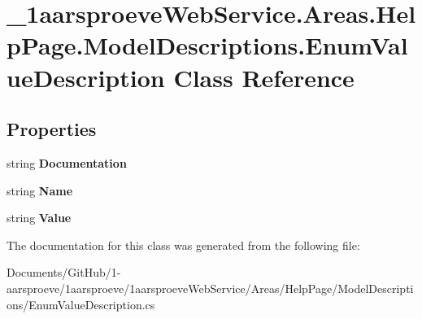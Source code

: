 \hypertarget{class__1aarsproeve_web_service_1_1_areas_1_1_help_page_1_1_model_descriptions_1_1_enum_value_description}{}\section{\+\_\+1aarsproeve\+Web\+Service.\+Areas.\+Help\+Page.\+Model\+Descriptions.\+Enum\+Value\+Description Class Reference}
\label{class__1aarsproeve_web_service_1_1_areas_1_1_help_page_1_1_model_descriptions_1_1_enum_value_description}
\subsection*{Properties}
\begin{DoxyCompactItemize}
\item 
\hypertarget{class__1aarsproeve_web_service_1_1_areas_1_1_help_page_1_1_model_descriptions_1_1_enum_value_description_a8b2b1e0baf970953a104b1c468a68c61}{}string {\bfseries Documentation}\label{class__1aarsproeve_web_service_1_1_areas_1_1_help_page_1_1_model_descriptions_1_1_enum_value_description_a8b2b1e0baf970953a104b1c468a68c61}

\item 
\hypertarget{class__1aarsproeve_web_service_1_1_areas_1_1_help_page_1_1_model_descriptions_1_1_enum_value_description_a7d3d2652afe86ecef65fa066bd7a233b}{}string {\bfseries Name}\label{class__1aarsproeve_web_service_1_1_areas_1_1_help_page_1_1_model_descriptions_1_1_enum_value_description_a7d3d2652afe86ecef65fa066bd7a233b}

\item 
\hypertarget{class__1aarsproeve_web_service_1_1_areas_1_1_help_page_1_1_model_descriptions_1_1_enum_value_description_a0670b18ee3d0ffe91340b5bc62e1b21a}{}string {\bfseries Value}\label{class__1aarsproeve_web_service_1_1_areas_1_1_help_page_1_1_model_descriptions_1_1_enum_value_description_a0670b18ee3d0ffe91340b5bc62e1b21a}

\end{DoxyCompactItemize}


The documentation for this class was generated from the following file\+:\begin{DoxyCompactItemize}
\item 
Documents/\+Git\+Hub/1-\/aarsproeve/1aarsproeve/1aarsproeve\+Web\+Service/\+Areas/\+Help\+Page/\+Model\+Descriptions/Enum\+Value\+Description.\+cs\end{DoxyCompactItemize}
